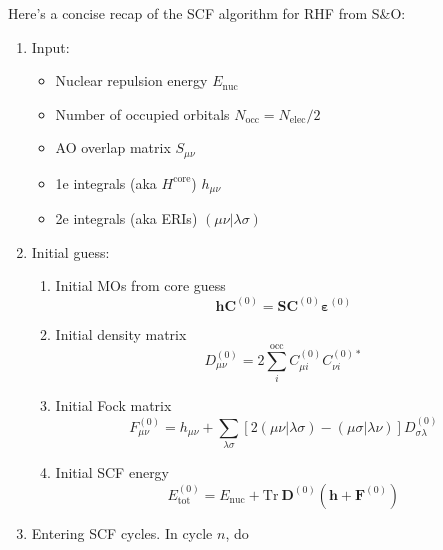 \documentclass[parskip=full]{article}
\begin{document}
    Here's a concise recap of the SCF algorithm for RHF from S\&O:
    \begin{enumerate}
        \item Input:
            \begin{itemize}
                \item Nuclear repulsion energy $E_{\textrm{nuc}}$
                \item Number of occupied orbitals $N_{\textrm{occ}} = N_{\textrm{elec}} / 2$
                \item AO overlap matrix $S_{\mu\nu}$
                \item 1e integrals (aka $H^{\textrm{core}}$) $h_{\mu\nu}$
                \item 2e integrals (aka ERIs) $(\mu\nu|\lambda\sigma)$
            \end{itemize}
        \item Initial guess:
        \begin{enumerate}
            \item Initial MOs from core guess
            \begin{equation}
                \mathbf{h} \mathbf{C}^{(0)}
                    = \mathbf{S} \mathbf{C}^{(0)} \bm{\varepsilon}^{(0)}
            \end{equation}
            \item Initial density matrix
            \begin{equation}
                D^{(0)}_{\mu\nu}
                    = 2 \sum_{i}^{\textrm{occ}} C^{(0)}_{\mu i} C^{(0)*}_{\nu i}
            \end{equation}
            \item Initial Fock matrix
            \begin{equation}
                F^{(0)}_{\mu\nu}
                    = h_{\mu\nu} + \sum_{\lambda\sigma} [2 (\mu\nu|\lambda\sigma) - (\mu\sigma|\lambda\nu)]
                    D^{(0)}_{\sigma\lambda}
            \end{equation}
            \item Initial SCF energy
            \begin{equation}
                E^{(0)}_{\textrm{tot}}
                    = E_{\textrm{nuc}} + \mathrm{Tr}~\mathbf{D}^{(0)} (\mathbf{h} + \mathbf{F}^{(0)})
            \end{equation}
        \end{enumerate}
        \item Entering SCF cycles. In cycle $n$, do
        \begin{enumerate}

\end{enumerate}
\end{enumerate}
\end{document}
